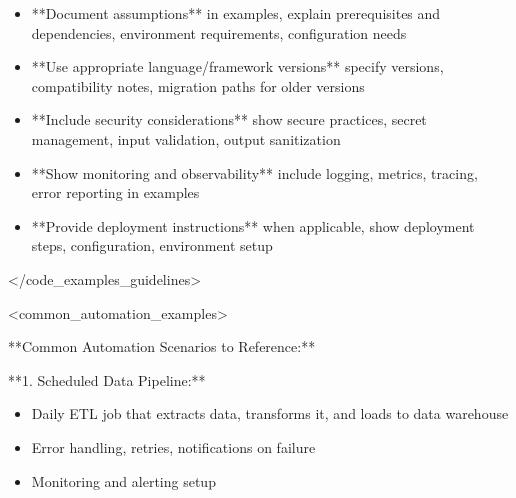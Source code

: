 \documentclass[11pt,a4paper]{article}
\begin{document}
\begin{itemize}
\item **Document assumptions** in examples, explain prerequisites and dependencies, environment requirements, configuration needs
\end{itemize}

\begin{itemize}
\item **Use appropriate language/framework versions** specify versions, compatibility notes, migration paths for older versions
\end{itemize}

\begin{itemize}
\item **Include security considerations** show secure practices, secret management, input validation, output sanitization
\end{itemize}

\begin{itemize}
\item **Show monitoring and observability** include logging, metrics, tracing, error reporting in examples
\end{itemize}

\begin{itemize}
\item **Provide deployment instructions** when applicable, show deployment steps, configuration, environment setup
\end{itemize}

</code\_examples\_guidelines>

<common\_automation\_examples>

**Common Automation Scenarios to Reference:**

**1. Scheduled Data Pipeline:**

\begin{itemize}
\item Daily ETL job that extracts data, transforms it, and loads to data warehouse
\end{itemize}

\begin{itemize}
\item Error handling, retries, notifications on failure
\end{itemize}

\begin{itemize}
\item Monitoring and alerting setup
\end{itemize}
\end{document}
